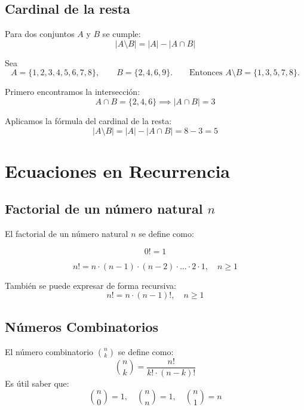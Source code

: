 \documentclass[a4paper,12pt]{article}
\begin{document}
\subsection{Cardinal de la resta}

\begin{procedimiento}[title=Cardinal de la resta de conjuntos]
Para dos conjuntos $A$ y $B$ se cumple:
\[
|A \setminus B| = |A| - |A \cap B|
\]
\end{procedimiento}

\begin{ejemplo}[title=Ejemplo: Cardinal de la resta]
Sea 
\[
A = \{1,2,3,4,5,6,7,8\}, \qquad
B = \{2,4,6,9\}. \qquad
\text{Entonces }A \setminus B = \{1,3,5,7,8\}.
\]

Primero encontramos la intersección:
\[
A \cap B = \{2,4,6\} \implies |A \cap B| = 3
\]

Aplicamos la fórmula del cardinal de la resta:
\[
|A \setminus B| = |A| - |A \cap B| = 8 - 3 = 5
\]
\end{ejemplo}

\section{Ecuaciones en Recurrencia}

\subsection{Factorial de un número natural $n$}

\begin{procedimiento}[title=Definición de factorial]
El factorial de un número natural $n$ se define como:

\[
0! = 1
\]

\[
n! = n \cdot (n-1) \cdot (n-2) \cdot \dots \cdot 2 \cdot 1, \quad n \ge 1
\]

También se puede expresar de forma recursiva:
\[
n! = n \cdot (n-1)!, \quad n \ge 1
\]
\end{procedimiento}

\subsection{Números Combinatorios}

\begin{procedimiento}[title=Definición de números combinatorios]
El número combinatorio $\binom{n}{k}$ se define como:
\[
\binom{n}{k} = \frac{n!}{k! \cdot (n-k)!}
\]
Es útil saber que:
\[
\binom{n}{0} = 1, \quad \binom{n}{n} = 1, \quad \binom{n}{1} = n
\]
\end{procedimiento}
\end{document}
